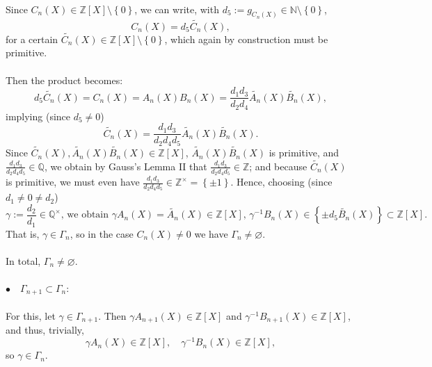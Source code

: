 \documentclass[11pt, a4paper, oneside]{article}
\theoremstyle{remark}
\theoremstyle{lemma}
\begin{document}
\\[1em]
Since \( C_n\left( X \right) \in \mathbb{Z}\left[ X \right] \setminus \left\{ 0 \right\} \), we can write, with \( d_5 := g_{C_n\left( X \right)} \in \mathbb{N} \setminus \left\{ 0 \right\} \),
\[
C_n\left( X \right) = d_5 \widetilde{C_n}\left( X \right),
\]
for a certain \( \widetilde{C_n}\left( X \right) \in \mathbb{Z}\left[ X \right] \setminus \left\{ 0 \right\} \), which again by construction must be primitive.
\\\\
Then the product becomes:
\[
d_5 \widetilde{C_n}\left( X \right) = C_n\left( X \right) = A_n\left( X \right) B_n\left( X \right) = \frac{d_1 d_3}{d_2 d_4} \widetilde{A_n}\left( X \right) \widetilde{B_n}\left( X \right),
\]
implying (since \( d_5 \neq 0 \))
\[
\widetilde{C_n}\left( X \right) = \frac{d_1 d_3}{d_2 d_4 d_5} \widetilde{A_n}\left( X \right) \widetilde{B_n}\left( X \right).
\]
Since \( \widetilde{C_n}\left( X \right), \widetilde{A_n}\left( X \right) \widetilde{B_n}\left( X \right) \in \mathbb{Z}\left[ X \right] \), \( \widetilde{A_n}\left( X \right) \widetilde{B_n}\left( X \right) \) is primitive, and \( \frac{d_1 d_3}{d_2 d_4 d_5} \in \mathbb{Q} \), we obtain by Gauss’s Lemma II that \( \frac{d_1 d_3}{d_2 d_4 d_5} \in \mathbb{Z} \); and because \( \widetilde{C_n}\left( X \right) \) is primitive, we must even have \( \frac{d_1 d_3}{d_2 d_4 d_5} \in \mathbb{Z}^{\times} = \left\{ \pm 1 \right\} \). Hence, choosing (since \( d_1 \neq 0 \neq d_2 \))
\[
\gamma := \frac{d_2}{d_1} \in \mathbb{Q}^{\times}\text{, we obtain } \gamma A_n\left( X \right) = \widetilde{A_n}\left( X \right) \in \mathbb{Z}\left[ X \right],\, \gamma^{-1} B_n\left( X \right) \in \left\{ \pm d_5 \widetilde{B_n}\left( X \right) \right\} \subset \mathbb{Z}\left[ X \right].
\]
That is, \( \gamma \in \Gamma_n \), so in the case \( C_n\left( X \right) \neq 0 \) we have \( \Gamma_n \neq \varnothing \).
\\\\
In total, \( \Gamma_n \neq \varnothing \).
\\\\
\(\bullet\quad \Gamma_{n+1} \subset \Gamma_n\):
\\\\
For this, let \( \gamma \in \Gamma_{n+1} \). Then \( \gamma A_{n+1}(X) \in \mathbb{Z}[X] \) and \( \gamma^{-1} B_{n+1}(X) \in \mathbb{Z}[X] \), and thus, trivially,
\[
\gamma A_n(X) \in \mathbb{Z}[X], \quad \gamma^{-1} B_n(X) \in \mathbb{Z}[X],
\]
so \( \gamma \in \Gamma_n \).
\\\\
\end{document}
